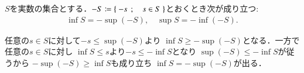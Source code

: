 	\begin{screen}
		\begin{lem}
			$S$を実数の集合とする．$-S \coloneqq \left\{\ -s\ \, ; \quad s \in S\ \right\}$とおくとき次が成り立つ:
			\begin{align}
				\inf{}{S} = -\sup{}{(-S)},
				\quad \sup{}{S} = -\inf{}{(-S)}.
			\end{align}
		\end{lem}
	\end{screen}
	
	\begin{prf}
		任意の$s \in S$に対して$-s \leq \sup{}{(-S)}$より
		$\inf{}{S} \geq -\sup{}{(-S)}$となる．一方で任意の$s \in S$に対し
		$\inf{}{S} \leq s$より$-s \leq -\inf{}{S}$となり
		$\sup{}{(-S)} \leq -\inf{}{S}$が従うから
		$-\sup{}{(-S)} \geq \inf{}{S}$も成り立ち
		$\inf{}{S} = -\sup{}{(-S)}$が出る．
		\QED
	\end{prf}
	
